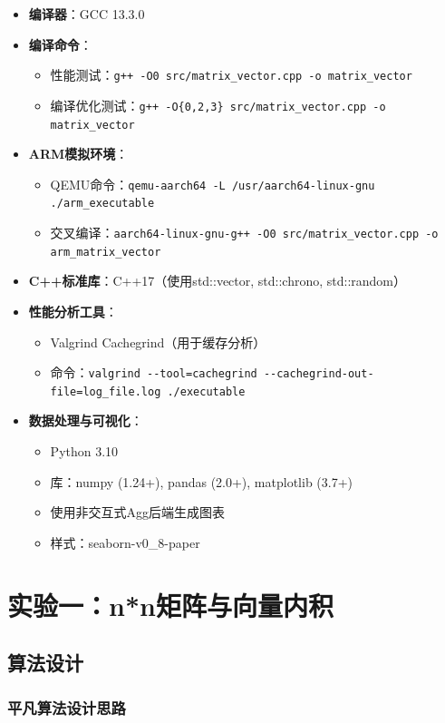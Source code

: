 \documentclass[a4paper,colorlinks=true,linkcolor=blue,urlcolor=blue,citecolor=green,bookmarks=true]{article}
\begin{document}
\begin{itemize}
  \item \textbf{编译器}：GCC 13.3.0
  \item \textbf{编译命令}：
  \begin{itemize}
    \item 性能测试：\verb|g++ -O0 src/matrix_vector.cpp -o matrix_vector|
    \item 编译优化测试：\verb|g++ -O{0,2,3} src/matrix_vector.cpp -o matrix_vector|
  \end{itemize}
  \item \textbf{ARM模拟环境}：
  \begin{itemize}
    \item QEMU命令：\verb|qemu-aarch64 -L /usr/aarch64-linux-gnu ./arm_executable|
    \item 交叉编译：\verb|aarch64-linux-gnu-g++ -O0 src/matrix_vector.cpp -o arm_matrix_vector|
  \end{itemize}
  \item \textbf{C++标准库}：C++17（使用std::vector, std::chrono, std::random）
  \item \textbf{性能分析工具}：
  \begin{itemize}
    \item Valgrind Cachegrind（用于缓存分析）
    \item 命令：\verb|valgrind --tool=cachegrind --cachegrind-out-file=log_file.log ./executable|
  \end{itemize}
  \item \textbf{数据处理与可视化}：
  \begin{itemize}
    \item Python 3.10
    \item 库：numpy (1.24+), pandas (2.0+), matplotlib (3.7+)
    \item 使用非交互式Agg后端生成图表
    \item 样式：seaborn-v0\_8-paper
  \end{itemize}
\end{itemize}

\section{实验一：n*n矩阵与向量内积}

\subsection{算法设计}

\subsubsection{平凡算法设计思路}
\end{document}
